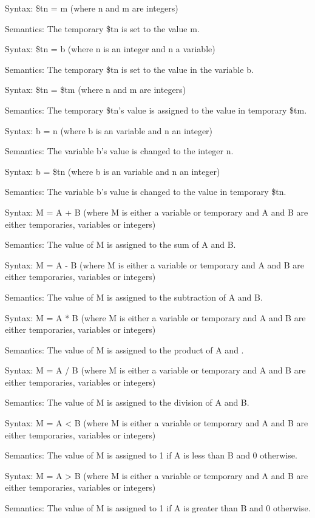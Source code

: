\documentclass{article}
\begin{document}
	Syntax: \$tn = m (where n and m are integers)
	
	Semantics: The temporary \$tn is set to the value m.
	
	Syntax: \$tn = b (where n is an integer and n a variable)
	
	Semantics: The temporary \$tn is set to the value in the variable b.
	
	Syntax: \$tn = \$tm (where n and m are integers)
	
	Semantics: The temporary \$tn's value is assigned to the value in temporary \$tm.
	
	Syntax: b = n (where b is an variable and n an integer)
	
	Semantics: The variable b's value is changed to the integer n.
	
	Syntax: b = \$tn (where b is an variable and n an integer)
	
	Semantics: The variable b's value is changed to the value in temporary \$tn. 
	
	Syntax: M = A + B (where M is either a variable or temporary and A and B are either temporaries, variables or integers) 
	
	Semantics: The value of M is assigned to the sum of A and B.
	
	Syntax: M = A - B (where M is either a variable or temporary and A and B are either temporaries, variables or integers) 
	
	Semantics: The value of M is assigned to the subtraction of A and B. 
	
	Syntax: M = A * B (where M is either a variable or temporary and A and B are either temporaries, variables or integers) 
	
	Semantics: The value of M is assigned to the product of A and .
	
	Syntax: M = A / B (where M is either a variable or temporary and A and B are either temporaries, variables or integers) 
	
	Semantics: The value of M is assigned to the division of A and B.
	
	Syntax: M = A < B (where M is either a variable or temporary and A and B are either temporaries, variables or integers) 
	
	Semantics: The value of M is assigned to 1 if A is less than B and 0 otherwise.
	
	Syntax: M = A > B (where M is either a variable or temporary and A and B are either temporaries, variables or integers) 
	
	Semantics: The value of M is assigned to 1 if A is greater than B and 0 otherwise.
	
\end{document}
